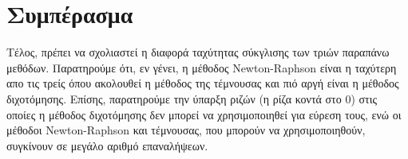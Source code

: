 \documentclass[a4paper,11pt]{article}
\newcommand{\lt}{\latintext}
\begin{document}
\section*{Συμπέρασμα}

Τέλος, πρέπει να σχολιαστεί η διαφορά ταχύτητας σύκγλισης των τριών παραπάνω μεθόδων. Παρατηρούμε ότι, εν γένει, η μέθοδος {\lt Newton-Raphson} είναι η ταχύτερη απο τις τρείς όπου ακολουθεί η μέθοδος της τέμνουσας και πιό αργή είναι η μέθοδος διχοτόμησης. Επίσης, παρατηρούμε την ύπαρξη ριζών (η ρίζα κοντά στο 0) στις οποίες η μέθοδος διχοτόμησης δεν μπορεί να χρησιμοποιηθεί για εύρεση τους, ενώ οι μέθοδοι  {\lt Newton-Raphson} και τέμνουσας, που μπορούν να χρησιμοποιηθούν, συγκίνουν σε μεγάλο αριθμό επαναλήψεων.
\end{document}
